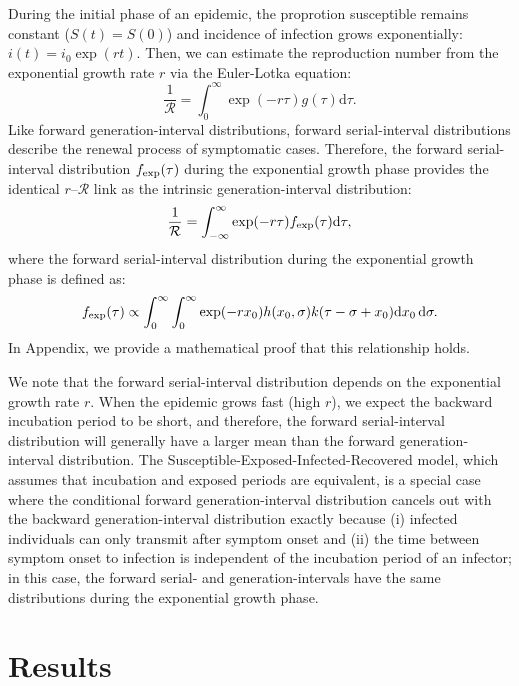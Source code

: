 \documentclass[12pt]{article}
\begin{document}
During the initial phase of an epidemic, the proprotion susceptible remains constant ($S(t) = S(0)$) and incidence of infection grows exponentially: $i(t)=i_0\exp(rt)$.
Then, we can estimate the reproduction number from the exponential growth rate $r$ via the Euler-Lotka equation:
\begin{equation}
\frac{1}{\mathcal R} = \int_0^\infty \exp(-r\tau) g(\tau) \mathrm{d} \tau.
\end{equation}
Like forward generation-interval distributions, 
forward serial-interval distributions describe the renewal process of symptomatic cases.
Therefore, the forward serial-interval distribution $f_{\tiny\textrm{exp}}(\tau)$ during the exponential growth phase provides the identical $r$--$\mathcal R$ link as the intrinsic generation-interval distribution:
\begin{equation}
\frac{1}{\mathcal R} = \int_{-\infty}^\infty \exp(-r\tau) f_{\tiny\textrm{exp}}(\tau) \mathrm{d} \tau,
\end{equation}
where the forward serial-interval distribution during the exponential growth phase is defined as:
\begin{equation}
f_{\tiny\textrm{exp}}(\tau) \propto \int_{0}^\infty \int_{0}^\infty \exp( -r x_0) h(x_0, \sigma) k(\tau-\sigma+x_0) \mathrm{d} x_0\, \mathrm{d}\sigma.
\end{equation}
In Appendix, we provide a mathematical proof that this relationship holds.

We note that the forward serial-interval distribution depends on the exponential growth rate $r$.
When the epidemic grows fast (high $r$), we expect the backward incubation period to be short, and therefore, the forward serial-interval distribution will generally have a larger mean than the forward generation-interval distribution.
The Susceptible-Exposed-Infected-Recovered model, which assumes that incubation and exposed periods are equivalent, is a special case where the conditional forward generation-interval distribution cancels out with the backward generation-interval distribution exactly because (i) infected individuals can only transmit after symptom onset and (ii) the time between symptom onset to infection is independent of the incubation period of an infector;
in this case, the forward serial- and generation-intervals have the same distributions during the exponential growth phase.

\section{Results}
\end{document}
